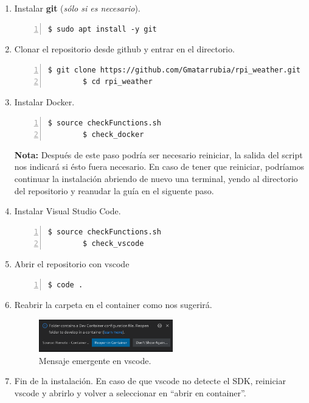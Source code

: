\begin{enumerate}
    \item Instalar \textbf{\gls{git}} (\emph{sólo si es necesario}).
    \begin{lstlisting}[style=consola, numbers=left]
        $ sudo apt install -y git
    \end{lstlisting}

    \item Clonar el repositorio desde github y entrar en el directorio.
    \begin{lstlisting}[style=consola, numbers=left]
        $ git clone https://github.com/Gmatarrubia/rpi_weather.git
        $ cd rpi_weather
    \end{lstlisting}

    \item Instalar Docker.
    \begin{lstlisting}[style=consola, numbers=left]
        $ source checkFunctions.sh
        $ check_docker
    \end{lstlisting}
    \textbf{Nota:} Después de este paso podría ser necesario reiniciar, la salida del
    script nos indicará si ésto fuera necesario. En caso de tener que reiniciar,
    podríamos continuar la instalación abriendo de nuevo una terminal, yendo al directorio
    del repositorio y reanudar la guía en el siguente paso.

    \item Instalar Visual Studio Code.
    \begin{lstlisting}[style=consola, numbers=left]
        $ source checkFunctions.sh
        $ check_vscode
    \end{lstlisting}

    \item Abrir el repositorio con \gls{vscode}
    \begin{lstlisting}[style=consola, numbers=left]
        $ code .
    \end{lstlisting}

    \item Reabrir la carpeta en el container como nos sugerirá.
    \begin{figure}[H]
        \centering
        \includegraphics[width=0.55\textwidth]{imgs/dev-container}
        \caption[Mensaje emergente en vscode]{Mensaje emergente en vscode.}
        \label{imgs:vscode-devcontainer}
    \end{figure}

    \item Fin de la instalación. En caso de que \gls{vscode} no detecte el \gls{SDK},
    reiniciar \gls{vscode} y abrirlo y volver a seleccionar en ``abrir en container''.
\end{enumerate}

